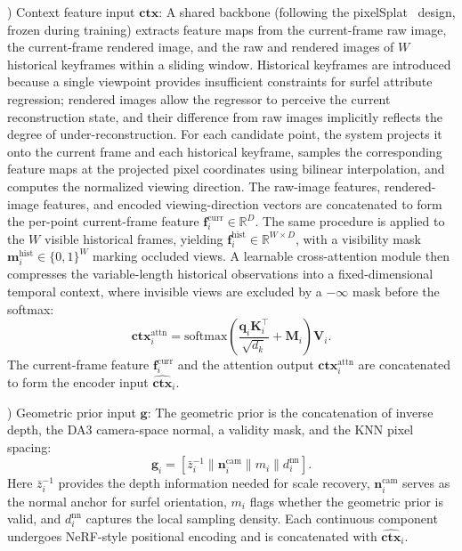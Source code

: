 \documentclass[letterpaper, 10pt, conference]{ieeeconf}
\begin{document}
\vspace{0.35em}
) Context feature input $\mathbf{ctx}$: A shared backbone (following the pixelSplat~\cite{charatan2024pixelsplat} design, frozen during training) extracts feature maps from the current-frame raw image, the current-frame rendered image, and the raw and rendered images of $W$ historical keyframes within a sliding window. Historical keyframes are introduced because a single viewpoint provides insufficient constraints for surfel attribute regression; rendered images allow the regressor to perceive the current reconstruction state, and their difference from raw images implicitly reflects the degree of under-reconstruction. For each candidate point, the system projects it onto the current frame and each historical keyframe, samples the corresponding feature maps at the projected pixel coordinates using bilinear interpolation, and computes the normalized viewing direction. The raw-image features, rendered-image features, and encoded viewing-direction vectors are concatenated to form the per-point current-frame feature $\mathbf{f}_i^{\text{curr}} \in \mathbb{R}^{D}$. The same procedure is applied to the $W$ visible historical frames, yielding $\mathbf{f}_i^{\text{hist}} \in \mathbb{R}^{W \times D}$, with a visibility mask $\mathbf{m}_i^{\text{hist}} \in \{0,1\}^{W}$ marking occluded views. A learnable cross-attention module then compresses the variable-length historical observations into a fixed-dimensional temporal context, where invisible views are excluded by a $-\infty$ mask before the softmax:
%
\begin{equation}
\mathbf{ctx}_i^{\text{attn}} = \text{softmax}\!\left(\frac{\mathbf{q}_i \mathbf{K}_i^\top}{\sqrt{d_k}} + \mathbf{M}_i\right) \mathbf{V}_i.
\end{equation}
%
The current-frame feature $\mathbf{f}_i^{\text{curr}}$ and the attention output $\mathbf{ctx}_i^{\text{attn}}$ are concatenated to form the encoder input $\hat{\mathbf{ctx}}_i$.

\vspace{0.35em}
) Geometric prior input $\mathbf{g}$: The geometric prior is the concatenation of inverse depth, the DA3 camera-space normal, a validity mask, and the KNN pixel spacing:
%
\begin{equation}
\mathbf{g}_i = [\bar{z}_i^{-1} \| \mathbf{n}_i^{\text{cam}} \| m_i \| d_i^{\text{nn}}].
\end{equation}
%
Here $\bar{z}_i^{-1}$ provides the depth information needed for scale recovery, $\mathbf{n}_i^{\text{cam}}$ serves as the normal anchor for surfel orientation, $m_i$ flags whether the geometric prior is valid, and $d_i^{\text{nn}}$ captures the local sampling density. Each continuous component undergoes NeRF-style positional encoding and is concatenated with $\hat{\mathbf{ctx}}_i$.
\end{document}
